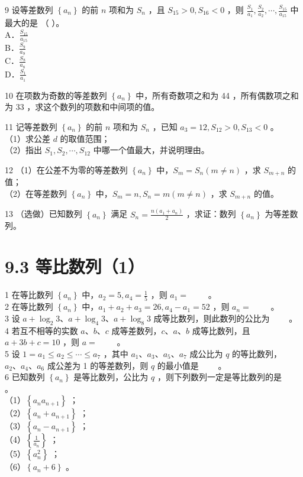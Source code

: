 \documentclass[10pt]{article}
\begin{document}
9 设等差数列 \(\left\{a_{n}\right\}\) 的前 \(n\) 项和为 \(S_{n}\) ，且 \(S_{15}>0, S_{16}<0\) ，则 \(\frac{S_{1}}{a_{1}}, \frac{S_{2}}{a_{2}}, \cdots, \frac{S_{15}}{a_{15}}\) 中最大的是 （ ）。\\
A．\(\frac{S_{15}}{a_{15}}\)\\
B．\(\frac{S_{9}}{a_{9}}\)\\
C．\(\frac{S_{8}}{a_{8}}\)\\
D．\(\frac{S_{1}}{a_{1}}\)

10 在项数为奇数的等差数列 \(\left\{a_{n}\right\}\) 中，所有奇数项之和为 44 ，所有偶数项之和为 33 ，求这个数列的项数和中间项的值。

11 记等差数列 \(\left\{a_{n}\right\}\) 的前 \(n\) 项和为 \(S_{n}\) ，已知 \(a_{3}=12, S_{12}>0, S_{13}<0\) 。\\
（1）求公差 \(d\) 的取值范围；\\
（2）指出 \(S_{1}, S_{2}, \cdots, S_{12}\) 中哪一个值最大，并说明理由。

12 （1）在公差不为零的等差数列 \(\left\{a_{n}\right\}\) 中，\(S_{m}=S_{n}(m \neq n)\) ，求 \(S_{m+n}\) 的值；\\
（2）在等差数列 \(\left\{a_{n}\right\}\) 中，\(S_{m}=n, S_{n}=m(m \neq n)\) ，求 \(S_{m+n}\) 的值。

13 （选做）已知数列 \(\left\{a_{n}\right\}\) 满足 \(S_{n}=\frac{n\left(a_{1}+a_{n}\right)}{2}\) ，求证：数列 \(\left\{a_{n}\right\}\) 为等差数列。

\section*{9.3 等比数列（1）}
1 在等比数列 \(\left\{a_{n}\right\}\) 中，\(a_{2}=5, a_{4}=\frac{1}{5}\) ，则 \(a_{1}=\) \(\qquad\)。\\
2 在等比数列 \(\left\{a_{n}\right\}\) 中，\(a_{1}+a_{2}+a_{3}=26, a_{4}-a_{1}=52\) ，则 \(a_{n}=\) \(\qquad\)。\\
3 设 \(a+\log _{2} 3 、 a+\log _{4} 3 、 a+\log _{8} 3\) 成等比数列，则此数列的公比为 \(\qquad\)。\\
4 若互不相等的实数 \(a 、 b 、 c\) 成等差数列，\(c 、 a 、 b\) 成等比数列，且 \(a+3 b+c=10\) ，则 \(a=\) \(\qquad\)。\\
5 设 \(1=a_{1} \leqslant a_{2} \leqslant \cdots \leqslant a_{7}\) ，其中 \(a_{1} 、 a_{3} 、 a_{5} 、 a_{7}\) 成公比为 \(q\) 的等比数列，\(a_{2} 、 a_{4} 、 a_{6}\) 成公差为 1 的等差数列，则 \(q\) 的最小值是 \(\qquad\)。\\
6 已知数列 \(\left\{a_{n}\right\}\) 是等比数列，公比为 \(q\) ，则下列数列一定是等比数列的是 \(\qquad\)。\\
（1）\(\left\{a_{n} a_{n+1}\right\}\) ；\\
（2）\(\left\{a_{n}+a_{n+1}\right\}\) ；\\
（3）\(\left\{a_{n}-a_{n+1}\right\}\) ；\\
（4）\(\left\{\frac{1}{a_{n}}\right\}\) ；\\
（5）\(\left\{a_{n}^{2}\right\}\) ；\\
（6）\(\left\{a_{n}+6\right\}\) 。
\end{document}
